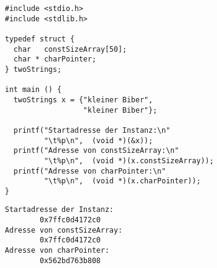 
\begin{frame}[fragile]
%
%
\begin{codebox}
\begin{verbatim}
#include <stdio.h>
#include <stdlib.h>

typedef struct {
  char   constSizeArray[50];
  char * charPointer;
} twoStrings;

int main () {
  twoStrings x = {"kleiner Biber",
                  "kleiner Biber"};
  
  printf("Startadresse der Instanz:\n"
         "\t%p\n",  (void *)(&x));
  printf("Adresse von constSizeArray:\n"
         "\t%p\n",  (void *)(x.constSizeArray));
  printf("Adresse von charPointer:\n"
         "\t%p\n",  (void *)(x.charPointer));
}
\end{verbatim}
\end{codebox}
%
%
\begin{cmdbox}[Ausgabe]
\begin{verbatim}
Startadresse der Instanz:
        0x7ffc0d4172c0
Adresse von constSizeArray:
        0x7ffc0d4172c0
Adresse von charPointer:
        0x562bd763b808
\end{verbatim}
\end{cmdbox}
%
\end{frame}


